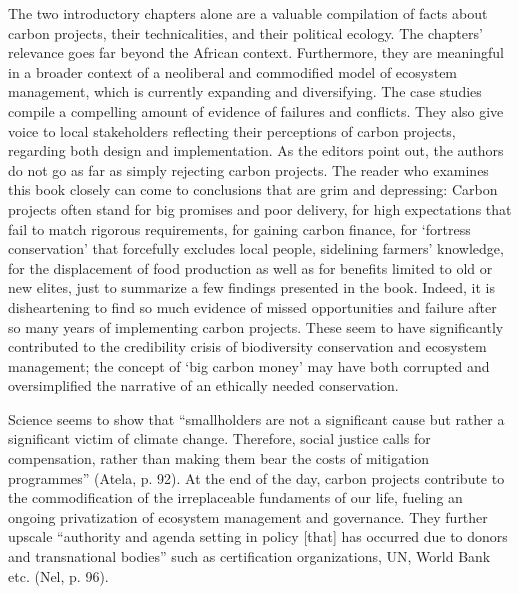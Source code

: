 \documentclass[10pt,a4paper]{article}
\begin{document}
\begin{multicols}{2}
The two introductory chapters alone are a valuable compilation of facts about carbon projects, their technicalities, and their political ecology. The chapters' relevance goes far beyond the African context. Furthermore, they are meaningful in a broader context of a neoliberal and commodified model of ecosystem management, which is currently expanding and diversifying. The case studies compile a compelling amount of evidence of failures and conflicts. They also give voice to local stakeholders reflecting their perceptions of carbon projects, regarding both design and implementation. As the editors point out, the authors do not go as far as simply rejecting carbon projects. The reader who examines this book closely can come to conclusions that are grim and depressing: Carbon projects often stand for big promises and poor delivery, for high expectations that fail to match rigorous requirements, for gaining carbon finance, for `fortress conservation' that forcefully excludes local people, sidelining farmers' knowledge, for the displacement of food production as well as for benefits limited to old or new elites, just to summarize a few findings presented in the book. Indeed, it is disheartening to find so much evidence of missed opportunities and failure after so many years of implementing carbon projects. These seem to have significantly contributed to the credibility crisis of biodiversity conservation and ecosystem management; the concept of `big carbon money' may have both corrupted and oversimplified the narrative of an ethically needed conservation.

Science seems to show that ``smallholders are not a significant cause but rather a significant victim of climate change. Therefore, social justice calls for compensation, rather than making them bear the costs of mitigation programmes'' (Atela, p. 92). At the end of the day, carbon projects contribute to the commodification of the irreplaceable fundaments of our life, fueling an ongoing privatization of ecosystem management and governance. They further upscale ``authority and agenda setting in policy [that] has occurred due to donors and transnational bodies'' such as certification organizations, UN, World Bank etc. (Nel, p. 96).


\end{multicols}
\end{document}
